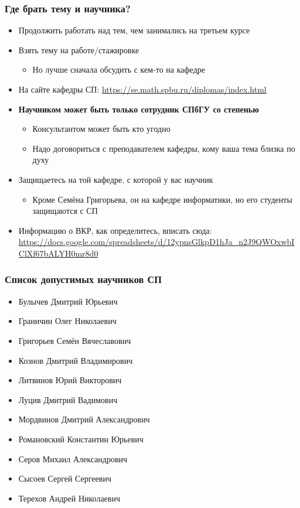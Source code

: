 \documentclass{../../slides-style}
\begin{document}
    \begin{frame}
        \frametitle{Где брать тему и научника?}
        \begin{itemize}
            \item Продолжить работать над тем, чем занимались на третьем курсе
            \item Взять тему на работе/стажировке
            \begin{itemize}
                \item Но лучше сначала обсудить с кем-то на кафедре
            \end{itemize}
            \item На сайте кафедры СП: \url{https://se.math.spbu.ru/diplomas/index.html}
            \item \textbf{Научником может быть только сотрудник СПбГУ со степенью}
            \begin{itemize}
                \item Консультантом может быть кто угодно
                \item Надо договориться с преподавателем кафедры, кому ваша тема близка по духу
            \end{itemize}
            \item Защищаетесь на той кафедре, с которой у вас научник
            \begin{itemize}
                \item Кроме Семёна Григорьева, он на кафедре информатики, но его студенты защищаются с СП
            \end{itemize}
            \item Информацию о ВКР, как определитесь, вписать сюда: \url{https://docs.google.com/spreadsheets/d/12ypnsGlkpD1hJa_n2J9QWOxwbIClXf67bALYH0mr8d0}
        \end{itemize}
    \end{frame}

    \begin{frame}
        \frametitle{Список допустимых научников СП}
        \begin{itemize}
            \item Булычев Дмитрий Юрьевич
            \item Граничин Олег Николаевич
            \item Григорьев Семён Вячеславович
            \item Кознов Дмитрий Владимирович
            \item Литвинов Юрий Викторович
            \item Луцив Дмитрий Вадимович
            \item Мордвинов Дмитрий Александрович
            \item Романовский Константин Юрьевич
            \item Серов Михаил Александрович
            \item Сысоев Сергей Сергеевич
            \item Терехов Андрей Николаевич
        \end{itemize}
    \end{frame}
\end{document}
